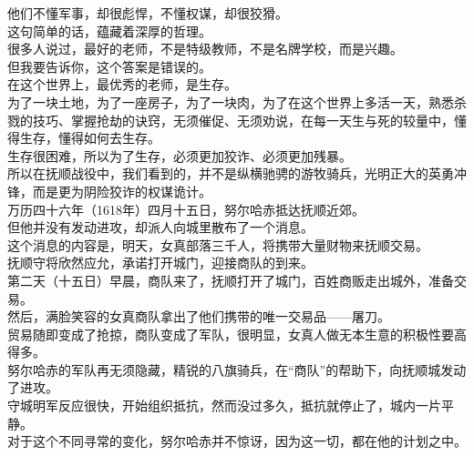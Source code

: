 \begin{multicols}{\theparacolNo}
他们不懂军事，却很彪悍，不懂权谋，却很狡猾。\\

这句简单的话，蕴藏着深厚的哲理。\\

很多人说过，最好的老师，不是特级教师，不是名牌学校，而是兴趣。\\

但我要告诉你，这个答案是错误的。\\

在这个世界上，最优秀的老师，是生存。\\

为了一块土地，为了一座房子，为了一块肉，为了在这个世界上多活一天，熟悉杀戮的技巧、掌握抢劫的诀窍，无须催促、无须劝说，在每一天生与死的较量中，懂得生存，懂得如何去生存。\\

生存很困难，所以为了生存，必须更加狡诈、必须更加残暴。\\

所以在抚顺战役中，我们看到的，并不是纵横驰骋的游牧骑兵，光明正大的英勇冲锋，而是更为阴险狡诈的权谋诡计。\\

万历四十六年（1618年）四月十五日，努尔哈赤抵达抚顺近郊。\\

但他并没有发动进攻，却派人向城里散布了一个消息。\\

这个消息的内容是，明天，女真部落三千人，将携带大量财物来抚顺交易。\\

抚顺守将欣然应允，承诺打开城门，迎接商队的到来。\\

第二天（十五日）早晨，商队来了，抚顺打开了城门，百姓商贩走出城外，准备交易。\\

然后，满脸笑容的女真商队拿出了他们携带的唯一交易品——屠刀。\\

贸易随即变成了抢掠，商队变成了军队，很明显，女真人做无本生意的积极性要高得多。\\

努尔哈赤的军队再无须隐藏，精锐的八旗骑兵，在“商队”的帮助下，向抚顺城发动了进攻。\\

守城明军反应很快，开始组织抵抗，然而没过多久，抵抗就停止了，城内一片平静。\\

对于这个不同寻常的变化，努尔哈赤并不惊讶，因为这一切，都在他的计划之中。\\


\end{multicols}
